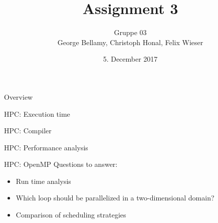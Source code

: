 \documentclass[shortpres]{beamer}
\title[{Tsunami simulation}]{Assignment 3}
\author[Bellamy, Honal, Wieser]{Gruppe 03\\George Bellamy, Christoph Honal, Felix Wieser\\\vspace{10pt}{\small Bachelorpraktikum}}
\institute[TU M\"unchen]{Technical University of Munich}
\date{5. December 2017}
\begin{document}
\maketitle

\begin{frame}{Overview}
	\begin{figure}
		\hspace{40pt}
	\end{figure}
\end{frame}

\begin{frame}{HPC: Execution time}
\end{frame}

\begin{frame}{HPC: Compiler}
\end{frame}

\begin{frame}{HPC: Performance analysis}
\end{frame}

\begin{frame}{HPC: OpenMP}
	Questions to answer:
	\begin{itemize}
		\item Run time analysis
		\item Which loop should be parallelized in a two-dimensional domain?
		\item Comparison of scheduling strategies
	\end{itemize}
\end{frame}
\end{document}
